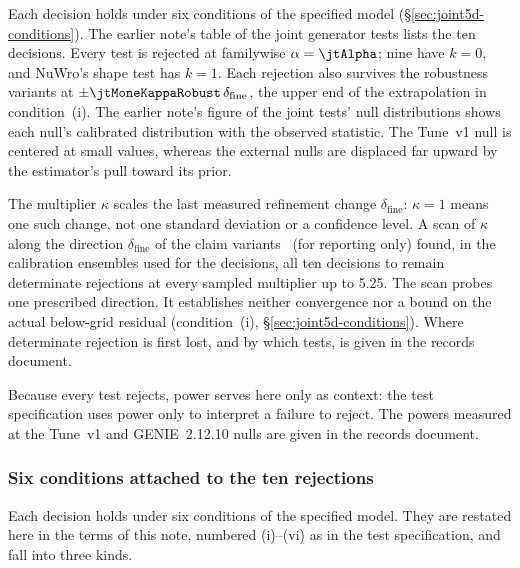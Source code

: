 Each decision holds under six conditions of the specified model (\S\ref{sec:joint5d-conditions}). The earlier note's table of the joint generator tests lists the ten decisions. Every test is rejected at familywise $\alpha=\jtAlpha$; nine have $k=0$, and NuWro's shape test has $k=1$. Each rejection also survives the robustness variants at $\pm\jtMoneKappaRobust\,\delta_{\mathrm{fine}}$, the upper end of the extrapolation in condition~(i). The earlier note's figure of the joint tests' null distributions shows each null's calibrated distribution with the observed statistic. The Tune~v1 null is centered at small values, whereas the external nulls are displaced far upward by the estimator's pull toward its prior.

The multiplier $\kappa$ scales the last measured refinement change $\delta_{\mathrm{fine}}$: $\kappa=1$ means one such change, not one standard deviation or a confidence level. A scan of $\kappa$ along the direction $\delta_{\mathrm{fine}}$ of the claim variants~\cite{JointTestKappa2026} (for reporting only) found, in the calibration ensembles used for the decisions, all ten decisions to remain determinate rejections at every sampled multiplier up to 5.25. The scan probes one prescribed direction. It establishes neither convergence nor a bound on the actual below-grid residual (condition~(i), \S\ref{sec:joint5d-conditions}). Where determinate rejection is first lost, and by which tests, is given in the records document.

Because every test rejects, power serves here only as context: the test specification uses power only to interpret a failure to reject. The powers measured at the Tune~v1 and GENIE~2.12.10 nulls are given in the records document.

\subsubsection{Six conditions attached to the ten rejections}

Each decision holds under six conditions of the specified model. They are restated here in the terms of this note, numbered (i)--(vi) as in the test specification, and fall into three kinds.

